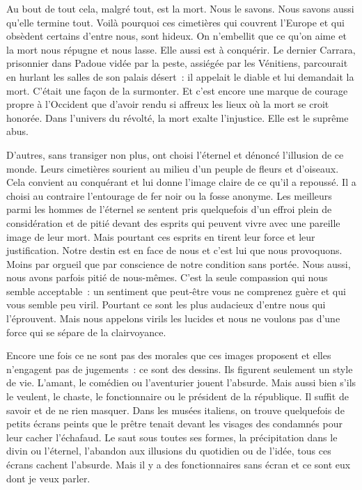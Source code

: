 \documentclass{book}
\begin{document}
Au bout de tout cela, malgré tout, est la mort. Nous le savons. Nous savons aussi qu'elle termine tout. Voilà pourquoi ces cimetières qui couvrent l'Europe et qui obsèdent certains d'entre nous, sont hideux. On n'embellit que ce qu'on aime et la mort nous répugne et nous lasse. Elle aussi est à conquérir. Le dernier Carrara, prisonnier dans Padoue vidée par la peste, assiégée par les Vénitiens, parcourait en hurlant les salles de son palais désert : il appelait le diable et lui demandait la mort. C'était une façon de la surmonter. Et c'est encore une marque de courage propre à l'Occident que d'avoir rendu si affreux les lieux où la mort se croit honorée. Dans l'univers du révolté, la mort exalte l'injustice. Elle est le suprême abus.

D'autres, sans transiger non plus, ont choisi l'éternel et dénoncé l'illusion de ce monde. Leurs cimetières sourient au milieu d'un peuple de fleurs et d'oiseaux. Cela convient au conquérant et lui donne l'image claire de ce qu'il a repoussé. Il a choisi au contraire l'entourage de fer noir ou la fosse anonyme. Les meilleurs parmi les hommes de l'éternel se sentent pris quelquefois d'un effroi plein de considération et de pitié devant des esprits qui peuvent vivre avec une pareille image de leur mort. Mais pourtant ces esprits en tirent leur force et leur justification. Notre destin est en face de nous et c'est lui que nous provoquons. Moins par orgueil que par conscience de notre condition sans portée. Nous aussi, nous avons parfois pitié de nous-mêmes. C'est la seule compassion qui nous semble acceptable : un sentiment que peut‑être vous ne comprenez guère et qui vous semble peu viril. Pourtant ce sont les plus audacieux d'entre nous qui l'éprouvent. Mais nous appelons virils les lucides et nous ne voulons pas d'une force qui se sépare de la clairvoyance.

Encore une fois ce ne sont pas des morales que ces images proposent et elles n'engagent pas de jugements : ce sont des dessins. Ils figurent seulement un style de vie. L'amant, le comédien ou l'aventurier jouent l'absurde. Mais aussi bien s'ils le veulent, le chaste, le fonctionnaire ou le président de la république. Il suffit de savoir et de ne rien masquer. Dans les musées italiens, on trouve quelquefois de petits écrans peints que le prêtre tenait devant les visages des condamnés pour leur cacher l'échafaud. Le saut sous toutes ses formes, la précipitation dans le divin ou l'éternel, l'abandon aux illusions du quotidien ou de l'idée, tous ces écrans cachent l'absurde. Mais il y a des fonctionnaires sans écran et ce sont eux dont je veux parler.
\end{document}
